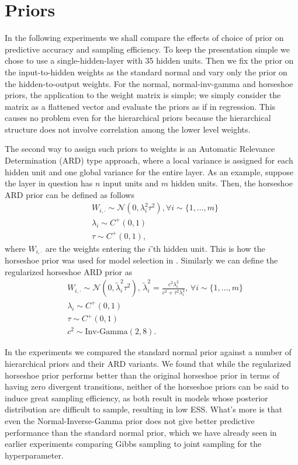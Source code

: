 \documentclass[12pt]{report}
\begin{document}
\section{Priors}
\label{sec:priors}
In the following experiments we shall compare the effects of choice of prior on predictive accuracy and sampling efficiency. To keep the presentation simple we chose to use a single-hidden-layer with 35 hidden units. Then we fix the prior on the input-to-hidden weights as the standard normal and vary only the prior on the hidden-to-output weights. For the normal, normal-inv-gamma and horseshoe priors, the application to the weight matrix is simple; we simply consider the matrix as a flattened vector and evaluate the priors as if in regression. This causes no problem even for the hierarchical priors because the hierarchical structure does not involve correlation among the lower level weights. 

The second way to assign such priors to weights is an Automatic Relevance Determination (ARD) type approach, where a local variance is assigned for each hidden unit and one global variance for the entire layer. As an example, suppose the layer in question has $n$ input units and $m$ hidden units. Then, the horseshoe ARD prior can be defined as follows 
\begin{align*}
& W_{i,\cdot} \sim \mathcal{N}(0,\lambda_i^2\tau^2) , \forall i \sim \{1,\dots, m \} \\
& \lambda_i \sim C^+(0,1) \\
& \tau \sim C^+(0,1), 
\end{align*}
where $ W_{i,\cdot}  $ are the weights entering the $i$'th hidden unit. This is how the horseshoe prior was used for model selection in \cite{ghosh2017model}. Similarly we can define the regularized horseshoe ARD prior as 
\begin{align*}
& W_{i,\cdot} \sim \mathcal{N}(0,\tilde{\lambda}_i^2\tau^2) , \, \tilde{\lambda}_i^2 = \frac{c^2 \lambda_i^2}{c^2 + \tau^2 \lambda_i^2}, \,  \forall i \sim \{1,\dots, m \} \\
& \lambda_i \sim C^+(0,1) \\
& \tau \sim C^+(0,1) \\
&c^2 \sim \text{Inv-Gamma}(2,8).
\end{align*}

In the experiments we compared the standard normal prior against a number of hierarchical priors and their ARD variants. We found that while the regularized horseshoe prior performs better than the original horseshoe prior in terms of having zero divergent transitions, neither of the horseshoe priors can be said to induce great sampling efficiency, as both result in models whose posterior distribution are difficult to sample, resulting in low ESS. What's more is that even the Normal-Inverse-Gamma prior does not give better predictive performance than the standard normal prior, which we have already seen in earlier experiments comparing Gibbs sampling to joint sampling for the hyperparameter. 
\end{document}
